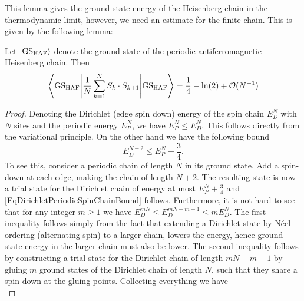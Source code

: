 This lemma gives the ground state energy of the Heisenberg chain in the thermodynamic limit, however, we need an estimate for the finite chain. This is given by the following lemma:
\begin{lemma}\label{LemmaHeisenbergChainFiniteNEstimate}
	Let $ \ket{\textnormal{GS}_{\textnormal{HAF}}} $ denote the ground state of the periodic antiferromagnetic Heisenberg chain. Then\begin{equation}
	\left\langle\textnormal{GS}_{\textnormal{HAF}}\Bigg\vert\frac{1}{N}\sum_{k=1}^N S_k\cdot S_{k+1} \Bigg\vert \textnormal{GS}_{\textnormal{HAF}}\right\rangle=\frac{1}{4}-\ln(2) +\mathcal{O}(N^{-1})
	\end{equation}
\end{lemma}
\begin{proof}
	Denoting the Dirichlet (edge spin down) energy of the spin chain $ E_D^N $ with $ N $ sites and the periodic energy $ E_P^N $, we have $ E_P^N\leq E_D^N $. 
	This follows directly from the variational principle.
On the other hand we have the following bound \begin{equation}\label{EqDirichletPeriodicSpinChainBound}
E_D^{N+2}\leq E_P^N+\frac{3}{4}.
\end{equation}
To see this, consider a periodic chain of length $ N $ in its ground state. Add a spin-down at each edge, making the chain of length $ N+2 $. The resulting state is now a trial state for the Dirichlet chain of energy at most $ E_P^N+\frac{3}{4} $ and \eqref{EqDirichletPeriodicSpinChainBound} follows. Furthermore, it is not hard to see that for any integer $ m\geq 1 $ we have $ E_D^{mN}\leq E_D^{mN-m+1}\leq mE_D^N $. The first inequality follows simply from the fact that extending a Dirichlet state by Néel ordering (alternating spin) to a larger chain, lowers the energy, hence ground state energy in the larger chain must also be lower. The second inequality follows by constructing a trial state for the Dirichlet chain of length $ mN-m+1 $ by gluing $ m $ ground states of the Dirichlet chain of length $ N $, such that they share a spin down at the gluing points. Collecting everything we have \begin{equation}

\end{equation}
\end{proof}
